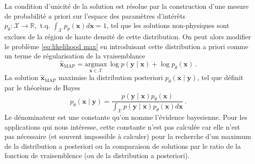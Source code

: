 La condition d'unicité de la solution est résolue par la construction d'une
mesure de probabilité a priori sur l'espace des paramètres d'intérêts 
$p_\theta: \mathcal{X} \rightarrow \mathbb{R}, \,\, \mathrm{t.q.}\,\, \int_{\mathcal{X}} p_\theta(\mathbf{x}) d\mathbf{x} = 1$,
tel que les solutions non-physiques sont exclues de la région de haute densité de cette distribution.
On peut alors modifier le problème \eqref{eq:likelihood max} en introduisant cette distribution 
a priori comme un terme de régularisation de la vraisemblance
\begin{equation}\label{eq:MAP intro}
        \hat{\mathbf{x}}_{\mathrm{MAP}} = \underset{\mathbf{x} \in \mathcal{X}}{\mathrm{argmax}}\, \log p(\mathbf{y} \mid \mathbf{x}) + \log p_\theta(\mathbf{x})\, .
\end{equation} 
La solution $\hat{\mathbf{x}}_{\mathrm{MAP}}$ maximise la distribution posteriori $p_\theta(\mathbf{x} \mid \mathbf{y})$, 
tel que définit par le théorème de Bayes
\begin{equation}\label{eq:Bayes}
        p_\theta(\mathbf{x} \mid \mathbf{y}) = \frac{p(\mathbf{y} \mid \mathbf{x}) p_\theta(\mathbf{x})}{\int_{\mathcal{X}} p(\mathbf{\mathbf{y}} \mid \mathbf{x}) p_\theta(\mathbf{x}) d\mathbf{x}}\, .
\end{equation} 
Le dénominateur est une constante qu'on nomme l'évidence bayesienne. 
Pour les applications qui nous intéresse, cette constante n'est pas calculée 
car elle n'est pas nécessaire (et souvent impossible à calculer) 
pour la recherche d'un maximum de la distribution a posteriori ou 
la comparaison de solutions par le ratio de la fonction de vraisemblence (ou de la distribution a posteriori).

